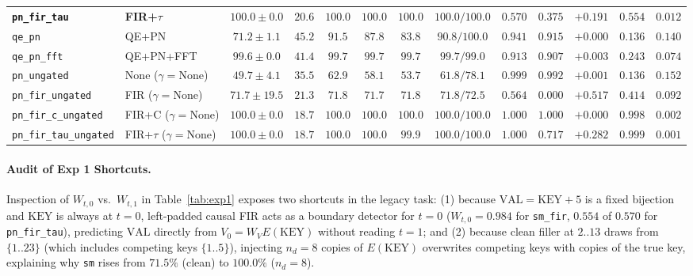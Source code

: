 \documentclass[11pt,a4paper]{article}
\begin{document}
\begin{table}[ht!]
\begin{tabular}{llccccccccccc}
\textbf{\texttt{pn\_fir\_tau}} & \textbf{FIR+$\tau$} & $\mathbf{100.0 \pm 0.0}$ & $20.6$ & $\mathbf{100.0}$ & $\mathbf{100.0}$ & $\mathbf{100.0}$ & $\mathbf{100.0/100.0}$ & $0.570$ & $0.375$ & $+0.191$ & $0.554$ & $0.012$ \\
\texttt{qe\_pn} & QE+PN & $71.2 \pm 1.1$ & $45.2$ & $91.5$ & $87.8$ & $83.8$ & $90.8/100.0$ & $0.941$ & $0.915$ & $+0.000$ & $0.136$ & $0.140$ \\
\texttt{qe\_pn\_fft} & QE+PN+FFT & $99.6 \pm 0.0$ & $41.4$ & $99.7$ & $99.7$ & $99.7$ & $99.7/99.0$ & $0.913$ & $0.907$ & $+0.003$ & $0.243$ & $0.074$ \\
\midrule
\texttt{pn\_ungated} & None ($\gamma{=}\text{None}$) & $49.7 \pm 4.1$ & $35.5$ & $62.9$ & $58.1$ & $53.7$ & $61.8/78.1$ & $0.999$ & $0.992$ & $+0.001$ & $0.136$ & $0.152$ \\
\texttt{pn\_fir\_ungated} & FIR ($\gamma{=}\text{None}$) & $71.7 \pm 19.5$ & $21.3$ & $71.8$ & $71.7$ & $71.8$ & $71.8/72.5$ & $0.564$ & $0.000$ & $+0.517$ & $0.414$ & $0.092$ \\
\texttt{pn\_fir\_c\_ungated} & FIR+C ($\gamma{=}\text{None}$) & $100.0 \pm 0.0$ & $18.7$ & $100.0$ & $100.0$ & $100.0$ & $100.0/100.0$ & $1.000$ & $1.000$ & $+0.000$ & $0.998$ & $0.002$ \\
\texttt{pn\_fir\_tau\_ungated} & FIR+$\tau$ ($\gamma{=}\text{None}$) & $100.0 \pm 0.0$ & $18.7$ & $100.0$ & $100.0$ & $99.9$ & $100.0/100.0$ & $1.000$ & $0.717$ & $+0.282$ & $0.999$ & $0.001$ \\
\bottomrule
\end{tabular}
\end{table}

\paragraph{Audit of Exp 1 Shortcuts.} Inspection of $W_{t,0}$ vs.\ $W_{t,1}$ in Table~\ref{tab:exp1} exposes two shortcuts in the legacy task: (1) because $\text{VAL} = \text{KEY}+5$ is a fixed bijection and $\text{KEY}$ is always at $t=0$, left-padded causal FIR acts as a boundary detector for $t=0$ ($W_{t,0}=0.984$ for \texttt{sm\_fir}, $0.554$ of $0.570$ for \texttt{pn\_fir\_tau}), predicting $\text{VAL}$ directly from $V_0 = W_V E(\text{KEY})$ without reading $t=1$; and (2) because clean filler at $2..13$ draws from $\{1..23\}$ (which includes competing keys $\{1..5\}$), injecting $n_d=8$ copies of $E(\text{KEY})$ overwrites competing keys with copies of the true key, explaining why \texttt{sm} rises from $71.5\%$ (clean) to $100.0\%$ ($n_d=8$).
\end{document}
